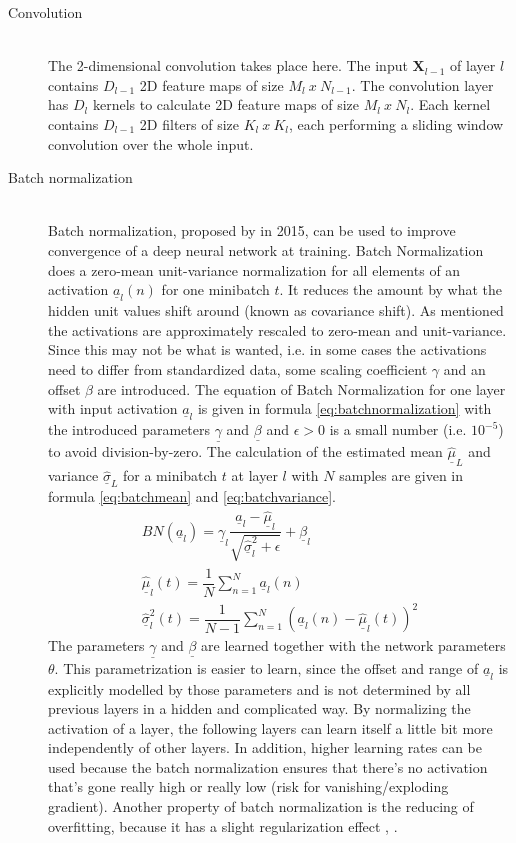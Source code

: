 \documentclass[12pt,DIV14,BCOR12mm,a4paper,footexclude,headinclude,halfparskip-,twoside,openright,cleardoubleempty,idxtotoc,bibtotoc,listtotoc]{scrreprt} %
\numberwithin{equation}{chapter}
\begin{document}
\begin{description}
	\item[Convolution]\hfill \\
The 2-dimensional convolution takes place here. The input $\mathbf{X}_{l-1}$ of layer $l$ contains $D_{l-1}$ 2D feature maps of size $M_l\ x\ N_{l-1}			$. The convolution layer has $D_l$ kernels to calculate 2D feature maps of size $M_l\ x\ N_l$. Each kernel contains $D_{l-1}$ 2D filters of size $K_l\ 		x\ K_l$, each performing a sliding window convolution over the whole input.
	\item[Batch normalization]\hfill \\
Batch normalization, proposed by \cite{Ioffe15BatchNorm} in 2015, can be used to improve convergence of a deep neural network at training. Batch 				Normalization does a zero-mean unit-variance normalization for all elements of an activation $\underline{a}_l(n)$ for one minibatch $t$. It reduces the amount by what the hidden unit values shift around (known as covariance shift). As mentioned the activations are approximately rescaled to zero-mean and unit-variance. Since this may not be what is wanted, i.e. in some cases the activations need to differ from standardized data, some scaling coefficient $\gamma$ and an offset $\beta$ are introduced. The equation of Batch Normalization for one layer with input activation $\underline{a}_l$ is given in formula \ref{eq:batchnormalization} with the introduced parameters $\underline{\gamma}$ and $\underline{\beta}$ and $\epsilon > 0$ is a small number (i.e. $10^{-5}$) to avoid division-by-zero. The calculation of the estimated mean $\underline{\hat{\mu}}_L$ and variance $\underline{\hat{\sigma}}_L$ for a minibatch $t$ at layer $l$ with  $N$ samples are given in formula \ref{eq:batchmean} and \ref{eq:batchvariance}.
\begin{align}
	BN(\underline{a}_l) = \underline{\gamma}_l\dfrac{\underline{a}_l-\underline{\hat{\mu}}_l}{\sqrt{\underline{\hat{\sigma}}_{l}^{2}+\epsilon}}+\underline{\beta}_l\label{eq:batchnormalization}\\
	\underline{\hat{\mu}}_l(t) = \dfrac{1}{N}\sum_{n=1}^{N}\underline{a}_l(n)\label{eq:batchmean}\\
	\underline{\hat{\sigma}}_{l}^{2}(t) = \dfrac{1}{N-1}\sum_{n=1}^{N}(\underline{a}_l(n)-\underline{\hat{\mu}}_l(t))^{2}\label{eq:batchvariance}
\end{align}		
The parameters $\underline{\gamma}$ and $\underline{\beta}$ are learned together with the network parameters $\theta$. This parametrization is easier to learn, since the offset and range of $\underline{a}_l$ is explicitly modelled by those parameters and is not determined by all previous layers in a hidden and complicated way. By normalizing the activation of a layer, the following layers can learn itself a little bit more independently of other layers. In addition, higher learning rates can be used because the batch normalization ensures that there's no activation that's gone really high or really low (risk for vanishing/exploding gradient). Another property of batch normalization is the reducing of overfitting, because it has a slight regularization effect \cite{DeepLearningDive}, \cite{LectureNotes_DeepLearning}.

\end{description}
\end{document}
